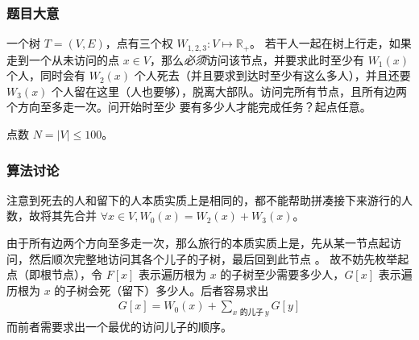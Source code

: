 			\subsubsection{题目大意}
				一个树 $T = (V, E)$，点有三个权 $W_{1, 2, 3}: V \mapsto \mathbb{R}_{+}$。 若干人一起在树上行走，如果走到一个从未访问的点 $x \in V$，那么\emph{必须}访问该节点，并要求此时至少有 $W_1(x)$ 个人，同时会有 $W_2(x)$ 个人死去（并且要求到达时至少有这么多人），并且还要  $W_3(x)$  个人留在这里（人也要够），脱离大部队。访问完所有节点，且所有边两个方向至多走一次。问开始时至少
				要有多少人才能完成任务？起点任意。
				
				点数 $N = |V| \le 100$。
			\subsubsection{算法讨论}
				注意到死去的人和留下的人本质实质上是相同的，都不能帮助拼凑接下来游行的人数，故将其先合并 $\forall x \in V, W_0(x) = W_2(x) + W_3(x)$。
				
				由于所有边两个方向至多走一次，那么旅行的本质实质上是，先从某一节点起访问，然后顺次完整地访问其各个儿子的子树，最后回到此节点%
				。
				故不妨先枚举起点（即根节点），令 $F[x]$ 表示遍历根为  $x$  的子树至少需要多少人，$G[x]$ 表示遍历根为  $x$  的子树会死（留下）多少人。后者容易求出
				\begin{align}
					G[x] = W_0(x) + \sum_{x\text{ 的儿子}\, y}  G[y]
				\end{align}
				而前者需要求出一个最优的访问儿子的顺序。
				
